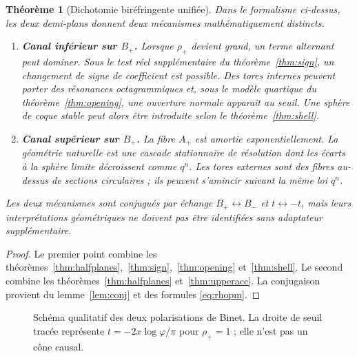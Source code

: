 \documentclass[11pt,a4paper]{article}
\newtheorem{theorem}{Théorème}[section]
\newcommand{\R}{\mathbb R}
\newcommand{\ph}{\varphi}
\begin{document}
\begin{theorem}[Dichotomie biréfringente unifiée]\label{thm:unified}
Dans le formalisme ci-dessus, les deux demi-plans donnent deux mécanismes mathématiquement distincts.
\begin{enumerate}[label=\textup{(\roman*)}]
\item \textbf{Canal inférieur sur $B_+$.} Lorsque $\rho_+$ devient grand, un terme alternant peut dominer. Sous le test réel supplémentaire du théorème~\ref{thm:sign}, un changement de signe de coefficient est possible. Des tores internes peuvent porter des résonances octagrammiques et, sous le modèle quartique du théorème~\ref{thm:opening}, une ouverture normale apparaît au seuil. Une sphère de coque stable peut alors être introduite selon le théorème~\ref{thm:shell}.
\item \textbf{Canal supérieur sur $B_+$.} La fibre $A_+$ est amortie exponentiellement. La géométrie naturelle est une cascade stationnaire de résolution dont les écarts à la sphère limite décroissent comme $q^n$. Les tores externes sont des fibres au-dessus de sections circulaires ; ils peuvent s'amincir suivant la même loi $q^n$.
\end{enumerate}
Les deux mécanismes sont conjugués par échange $B_+\leftrightarrow B_-$ et $t\leftrightarrow -t$, mais leurs interprétations géométriques ne doivent pas être identifiées sans adaptateur supplémentaire.
\end{theorem}

\begin{proof}
Le premier point combine les théorèmes~\ref{thm:halfplanes},~\ref{thm:sign},~\ref{thm:opening} et~\ref{thm:shell}. Le second combine les théorèmes~\ref{thm:halfplanes} et~\ref{thm:upperacc}. La conjugaison provient du lemme~\ref{lem:conj} et des formules \eqref{eq:rhopm}.
\end{proof}

\begin{figure}[ht]
\centering
{}
\caption{Schéma qualitatif des deux polarisations de Binet. La droite de seuil tracée représente $t=-2x\log\ph/\pi$ pour $\rho_+=1$ ; elle n'est pas un cône causal.}
\label{fig:halfplanes}
\end{figure}
\end{document}
